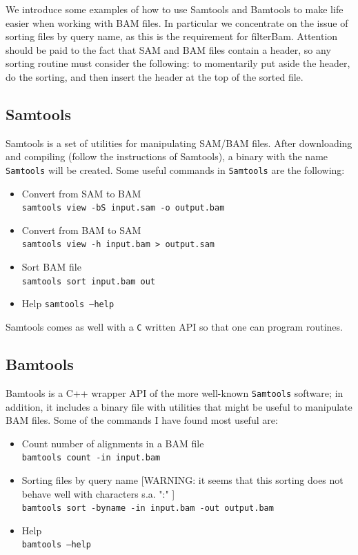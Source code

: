 \documentclass[11pt]{article}
\newcommand{\software}[1]{{\fontfamily{cmss}\selectfont#1}}
\newcommand{\unix}[1]{\texttt{#1}}
\begin{document}
{We introduce some examples of how to use Samtools and Bamtools to make life easier when working with BAM files.
In particular we concentrate on the issue of sorting files by query name, as this is the requirement for 
filterBam. Attention should be paid to the fact that SAM and BAM files contain a header, so any sorting 
routine must consider the following: to momentarily put aside the header, do the sorting, and then insert the 
header at the top of the sorted file.
 
\subsection{Samtools}
\software{Samtools} is a set of utilities for manipulating SAM/BAM files. After downloading and compiling
(follow the instructions of \software{Samtools}), a binary with the name \unix{Samtools} will be created.
Some useful commands in \unix{Samtools} are the following:

\begin{itemize}
	\item	Convert from SAM to BAM \\
			\unix{samtools view -bS input.sam -o output.bam} 
	\item	Convert from BAM to SAM \\
			\unix{samtools view -h input.bam > output.sam}
	\item	Sort BAM file \\
			\unix{samtools sort input.bam out}
	\item	Help
			\unix{samtools --help} 
\end{itemize}

\software{Samtools} comes as well with a \unix{C} written API so that one can program routines. 

\subsection{Bamtools}

\software{Bamtools} is a C++ wrapper API of the more well-known \unix{Samtools} software; in addition, it 
includes a binary file with utilities that might be useful to manipulate BAM files. Some of the commands 
I have found most useful are:

\begin{itemize} 
	\item	Count number of alignments in a BAM file \\
			\unix{bamtools count -in input.bam}
	\item	Sorting files by query name [WARNING: it seems that this sorting does not behave well with 
			characters s.a. ":" ] \\
			\unix{bamtools sort -byname -in input.bam -out output.bam}
	\item	Help \\
			\unix{bamtools --help}			
\end{itemize}


}
\end{document}
